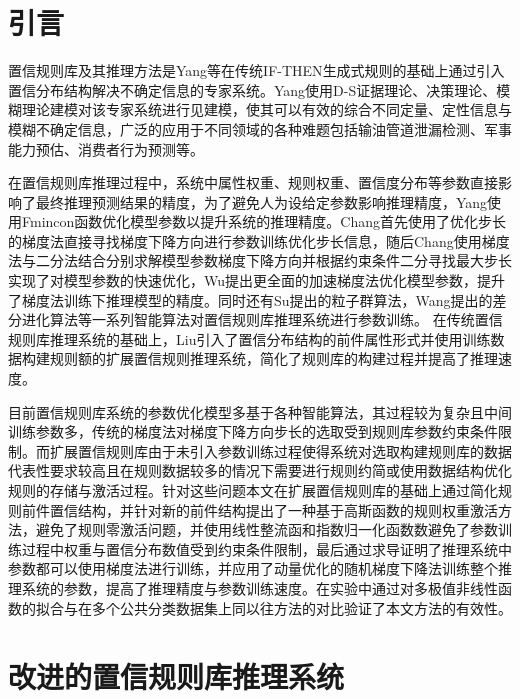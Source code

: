 \documentclass{cjc}
\begin{document}
\maketitle

\section{引言}
置信规则库\cite{a3}及其推理方法是Yang等在传统IF-THEN\cite{a5}生成式规则的基础上通过引入置信分布结构解决不确定信息的专家系统。Yang使用D-S证据理论\cite{a1,a2}、决策理论\cite{b1}、模糊理论\cite{a4}建模对该专家系统进行见建模，使其可以有效的综合不同定量、定性信息与模糊不确定信息，广泛的应用于不同领域的各种难题包括输油管道泄漏检测\cite{a6}、军事能力预估\cite{a7}、消费者行为预测\cite{a8}等。 

在置信规则库推理过程中，系统中属性权重、规则权重、置信度分布等参数直接影响了最终推理预测结果的精度，为了避免人为设给定参数影响推理精度，Yang使用Fmincon\cite{a9}函数优化模型参数以提升系统的推理精度。Chang\cite{a10}首先使用了优化步长的梯度法直接寻找梯度下降方向进行参数训练优化步长信息，随后Chang\cite{a11}使用梯度法与二分法结合分别求解模型参数梯度下降方向并根据约束条件二分寻找最大步长实现了对模型参数的快速优化，Wu\cite{a12}提出更全面的加速梯度法优化模型参数，提升了梯度法训练下推理模型的精度。同时还有Su\cite{a13}提出的粒子群算法，Wang\cite{a14}提出的差分进化算法等一系列智能算法对置信规则库推理系统进行参数训练。 在传统置信规则库推理系统的基础上，Liu\cite{a15}引入了置信分布结构的前件属性形式并使用训练数据构建规则额的扩展置信规则推理系统，简化了规则库的构建过程并提高了推理速度。

目前置信规则库系统的参数优化模型多基于各种智能算法，其过程较为复杂且中间训练参数多，传统的梯度法对梯度下降方向步长的选取受到规则库参数约束条件限制。而扩展置信规则库由于未引入参数训练过程使得系统对选取构建规则库的数据代表性要求较高且在规则数据较多的情况下需要进行规则约简或使用数据结构优化规则的存储与激活过程。针对这些问题本文在扩展置信规则库的基础上通过简化规则前件置信结构，并针对新的前件结构提出了一种基于高斯函数的规则权重激活方法，避免了规则零激活问题，并使用线性整流函和指数归一化函数数避免了参数训练过程中权重与置信分布数值受到约束条件限制，最后通过求导证明了推理系统中参数都可以使用梯度法进行训练，并应用了动量优化的随机梯度下降法训练整个推理系统的参数，提高了推理精度与参数训练速度。在实验中通过对多极值非线性函数的拟合与在多个公共分类数据集上同以往方法的对比验证了本文方法的有效性。
\section{改进的置信规则库推理系统}
\end{document}
